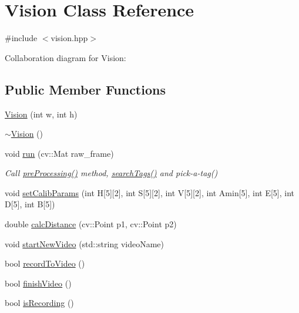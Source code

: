 \hypertarget{class_vision}{}\section{Vision Class Reference}
\label{class_vision}


{\ttfamily \#include $<$vision.\+hpp$>$}



Collaboration diagram for Vision\+:
\subsection*{Public Member Functions}
\begin{DoxyCompactItemize}
\item 
\hyperlink{class_vision_a823f146baaaa771e4e31b021c82fa8ca}{Vision} (int w, int h)
\item 
\hyperlink{class_vision_a12bc039b4fcdb229e70c55d2660392a8}{$\sim$\+Vision} ()
\item 
void \hyperlink{class_vision_a8d7335b29584429ff5b5c24958896b08}{run} (cv\+::\+Mat raw\+\_\+frame)
\begin{DoxyCompactList}\small\item\em Call \hyperlink{class_vision_a6d23298e695a938d2491ae1f6264c694}{pre\+Processing()} method, \hyperlink{class_vision_a717cabba99a7e8d5613df6dc699e31fe}{search\+Tags()} and pick-\/a-\/tag() \end{DoxyCompactList}\item 
void \hyperlink{class_vision_a5871e49c1e8bdfd214c602707e8dfffc}{set\+Calib\+Params} (int H\mbox{[}5\mbox{]}\mbox{[}2\mbox{]}, int S\mbox{[}5\mbox{]}\mbox{[}2\mbox{]}, int V\mbox{[}5\mbox{]}\mbox{[}2\mbox{]}, int Amin\mbox{[}5\mbox{]}, int E\mbox{[}5\mbox{]}, int D\mbox{[}5\mbox{]}, int B\mbox{[}5\mbox{]})
\item 
double \hyperlink{class_vision_a4f6f281bd1aaacad29c9e48f4d8fb1b9}{calc\+Distance} (cv\+::\+Point p1, cv\+::\+Point p2)
\item 
void \hyperlink{class_vision_ae3ec43e811508f326910f99c416332db}{start\+New\+Video} (std\+::string video\+Name)
\item 
bool \hyperlink{class_vision_a2ce5281f1eb08b71952407ef2a3f5eab}{record\+To\+Video} ()
\item 
bool \hyperlink{class_vision_a5c7366071fde8a1b916be0721adaa275}{finish\+Video} ()
\item 
bool \hyperlink{class_vision_a7990c9cb8684e1d1c92a5b6aa99abe6f}{is\+Recording} ()
\item 

\end{DoxyCompactItemize}
